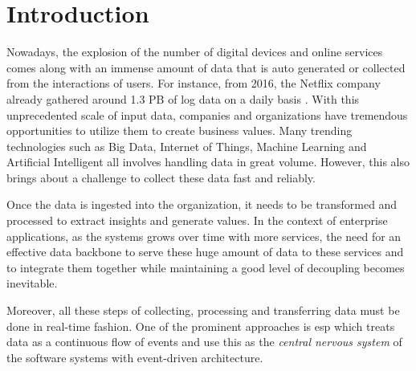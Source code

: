 \chapter{Introduction} \label{chap:intro}
Nowadays, the explosion of the number of digital devices and online services comes along with an immense amount of data that is auto generated or collected from the interactions of users. For instance, from 2016, the Netflix company already gathered around 1.3 PB of log data on a daily basis \cite{netflixpipeline}. With this unprecedented scale of input data, companies and organizations have tremendous opportunities to utilize them to create business values. Many trending technologies such as Big Data, Internet of Things, Machine Learning and Artificial Intelligent all involves handling data in great volume. However, this also brings about a challenge to collect these data fast and reliably.


Once the data is ingested into the organization, it needs to be transformed  and processed to extract insights and generate values. In the context of enterprise applications, as the systems grows over time with more services, the need for an effective data backbone to serve these huge amount of data to these services and to integrate them together while maintaining a good level of decoupling becomes inevitable.

Moreover, all these steps of collecting, processing and transferring data must be done in real-time fashion. One of the prominent approaches is \acrfull{esp} which treats data as a continuous flow of events and use this as the \emph{central nervous system} of the software systems with event-driven architecture.


